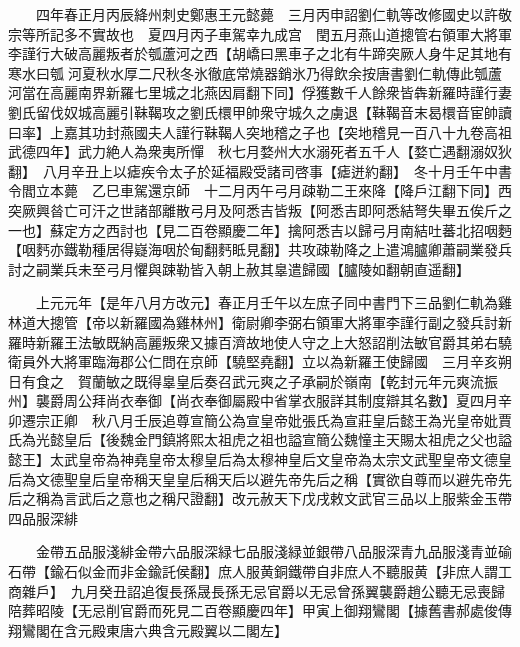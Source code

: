 　　四年春正月丙辰絳州刺史鄭惠王元懿薨　三月丙申詔劉仁軌等改修國史以許敬宗等所記多不實故也　夏四月丙子車駕幸九成宫　閏五月燕山道摠管右領軍大將軍李謹行大破高麗叛者於瓠蘆河之西【胡嶠曰黑車子之北有牛蹄突厥人身牛足其地有寒水曰瓠河夏秋水厚二尺秋冬氷徹底常燒器銷氷乃得飲余按唐書劉仁軌傳此瓠蘆河當在高麗南界新羅七里城之北燕因肩翻下同】俘獲數千人餘衆皆犇新羅時謹行妻劉氏留伐奴城高麗引靺鞨攻之劉氏檈甲帥衆守城久之虜退【靺鞨音末曷檈音宦帥讀曰率】上嘉其功封燕國夫人謹行靺鞨人突地稽之子也【突地稽見一百八十九卷高祖武德四年】武力絶人為衆夷所憚　秋七月婺州大水溺死者五千人【婺亡遇翻溺奴狄翻】　八月辛丑上以瘧疾令太子於延福殿受諸司啓事【瘧迸約翻】　冬十月壬午中書令閻立本薨　乙巳車駕還京師　十二月丙午弓月疎勒二王來降【降戶江翻下同】西突厥興㫺亡可汗之世諸部離散弓月及阿悉吉皆叛【阿悉吉即阿悉結弩失畢五俟斤之一也】蘇定方之西討也【見二百卷顯慶二年】擒阿悉吉以歸弓月南結吐蕃北招咽麪【咽麫亦鐵勒種居得嶷海咽於甸翻麫眡見翻】共攻疎勒降之上遣鴻臚卿蕭嗣業發兵討之嗣業兵未至弓月懼與踈勒皆入朝上赦其辠遣歸國【臚陵如翻朝直遥翻】

　　上元元年【是年八月方改元】春正月壬午以左庶子同中書門下三品劉仁軌為雞林道大摠管【帝以新羅國為雞林州】衛尉卿李弼右領軍大將軍李謹行副之發兵討新羅時新羅王法敏既納高麗叛衆又據百濟故地使人守之上大怒詔削法敏官爵其弟右驍衛員外大將軍臨海郡公仁問在京師【驍堅堯翻】立以為新羅王使歸國　三月辛亥朔日有食之　賀蘭敏之既得辠皇后奏召武元爽之子承嗣於嶺南【乾封元年元爽流振州】襲爵周公拜尚衣奉御【尚衣奉御屬殿中省掌衣服詳其制度辯其名數】夏四月辛卯遷宗正卿　秋八月壬辰追尊宣簡公為宣皇帝妣張氏為宣莊皇后懿王為光皇帝妣賈氏為光懿皇后【後魏金門鎮將熙太祖虎之祖也謚宣簡公魏憧主天賜太祖虎之父也謚懿王】太武皇帝為神堯皇帝太穆皇后為太穆神皇后文皇帝為太宗文武聖皇帝文德皇后為文德聖皇后皇帝稱天皇皇后稱天后以避先帝先后之稱【實欲自尊而以避先帝先后之稱為言武后之意也之稱尺證翻】改元赦天下戊戌敕文武官三品以上服紫金玉帶四品服深緋

　　金帶五品服淺緋金帶六品服深緑七品服淺緑並銀帶八品服深青九品服淺青並䃋石帶【鍮石似金而非金鍮託侯翻】庶人服黄銅鐵帶自非庶人不聽服黄【非庶人謂工商雜戶】　九月癸丑詔追復長孫晟長孫无忌官爵以无忌曾孫翼襲爵趙公聽无忌喪歸陪葬昭陵【无忌削官爵而死見二百卷顯慶四年】甲寅上御翔鸞閣【據舊書郝處俊傳翔鸞閣在含元殿東唐六典含元殿翼以二閣左】

